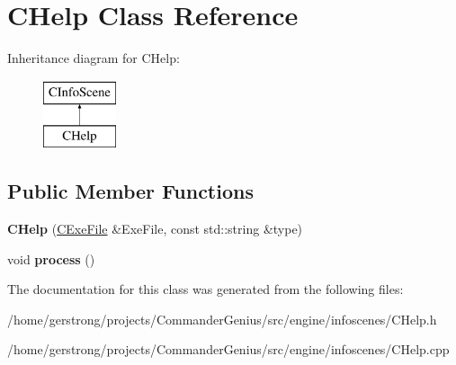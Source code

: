 \hypertarget{class_c_help}{
\section{CHelp Class Reference}
\label{class_c_help}
}
Inheritance diagram for CHelp:\begin{figure}[H]
\begin{center}
\leavevmode
\includegraphics[height=2cm]{class_c_help}
\end{center}
\end{figure}
\subsection*{Public Member Functions}
\begin{DoxyCompactItemize}
\item 
\hypertarget{class_c_help_abde87ccdd1dd972fb3a9ba27a9745d66}{
{\bfseries CHelp} (\hyperlink{class_c_exe_file}{CExeFile} \&ExeFile, const std::string \&type)}
\label{class_c_help_abde87ccdd1dd972fb3a9ba27a9745d66}

\item 
\hypertarget{class_c_help_ac8f662417ec27211ad9ff4f699ebd90b}{
void {\bfseries process} ()}
\label{class_c_help_ac8f662417ec27211ad9ff4f699ebd90b}

\end{DoxyCompactItemize}


The documentation for this class was generated from the following files:\begin{DoxyCompactItemize}
\item 
/home/gerstrong/projects/CommanderGenius/src/engine/infoscenes/CHelp.h\item 
/home/gerstrong/projects/CommanderGenius/src/engine/infoscenes/CHelp.cpp\end{DoxyCompactItemize}
